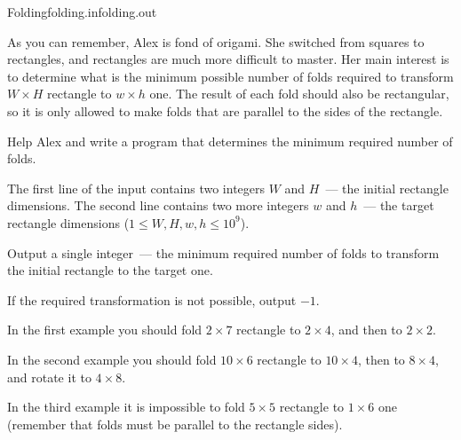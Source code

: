 \begin{problem}{Folding}{folding.in}{folding.out}{\timeLimit}


As you can remember, Alex is fond of origami. She switched from squares
to rectangles, and rectangles are much more difficult to master.
Her main interest is to determine what is the minimum possible number of
folds required to transform $W \times H$ rectangle to $w \times h$ one.
The result of each fold should also be rectangular, so it is only allowed to
make folds that are parallel to the sides of the rectangle.

Help Alex and write a program that determines the minimum required number of folds.

\InputFile

The first line of the input contains two integers $W$ and $H$~---
the initial rectangle dimensions.  
The second line contains two more integers $w$ and $h$~---
the target rectangle dimensions ($1 \le W, H, w, h \le 10^9$).

\OutputFile

Output a single integer~--- the minimum required number of folds
to transform the initial rectangle to the target one.

If the required transformation is not possible, output $-1$.

\Examples

\begin{example}
%
%
%
\end{example}

In the first example you should fold $2\times7$ rectangle to $2\times4$, 
and then to $2\times2$.

In the second example you should fold $10\times6$ rectangle to $10\times4$, 
then to $8\times4$, and rotate it to $4\times8$.

In the third example it is impossible to fold $5\times5$ rectangle to $1\times6$ one
(remember that folds must be parallel to the rectangle sides).

\end{problem}

